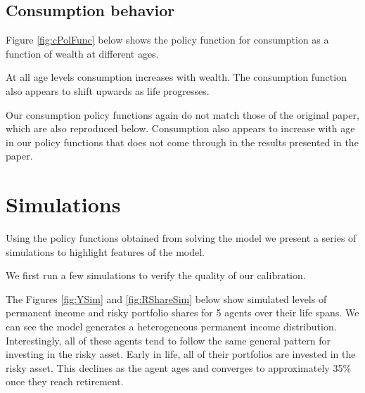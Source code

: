 \documentclass[./CGMPortfolio.tex]{subfiles}
\begin{document}
\subsection{Consumption behavior}

Figure \ref{fig:cPolFunc} below shows the policy function for consumption as a function of wealth at different ages.

At all age levels consumption increases with wealth. The consumption function also appears to shift upwards as life progresses.

Our consumption policy functions again do not match those of the original paper, which are also reproduced below. Consumption also appears to increase with age in our policy functions that does not come through in the results presented in the paper. 

\providecommand{\figName}{Consumption-Policy-Function} %
\providecommand{\figFile}{Cons_Pol} %
\hypertarget{\figFile}{}
\hypertarget{\figName}{}

\hypertarget{Simulations}{}
\section{Simulations}

Using the policy functions obtained from solving the model we present a series of simulations to highlight features of the model.

We first run a few simulations to verify the quality of our calibration.

The Figures \ref{fig:YSim} and \ref{fig:RShareSim} below show simulated levels of permanent income and risky portfolio shares for 5 agents over their life spans. We can see the model generates a heterogeneous permanent income distribution. Interestingly, all of these agents tend to follow the same general pattern for investing in the risky asset. Early in life, all of their portfolios are invested in the risky asset. This declines as the agent ages and converges to approximately 35\% once they reach retirement.

\providecommand{\figName}{Income-Simulation} %
\providecommand{\figFile}{Y_Sim} %
\hypertarget{\figFile}{}
\hypertarget{\figName}{}
\end{document}
